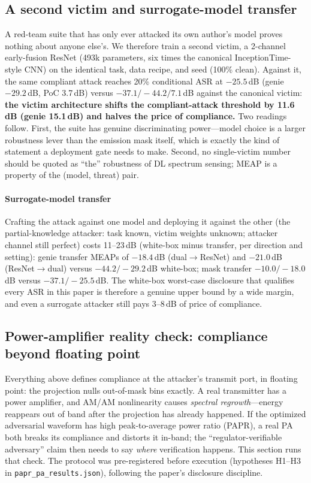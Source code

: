\documentclass[review]{elsarticle}
\begin{document}
\subsection{A second victim and surrogate-model transfer}
\label{sec:victim2}

A red-team suite that has only ever attacked its own author's model proves
nothing about anyone else's. We therefore train a second victim, a
2-channel early-fusion ResNet (493k parameters, six times the canonical
InceptionTime-style CNN) on the identical task, data recipe, and seed
(100\% clean). Against it, the same compliant attack reaches 20\%
conditional ASR at $-25.5$\,dB (genie $-29.2$\,dB, PoC 3.7\,dB) versus
$-37.1/-44.2/7.1$\,dB against the canonical victim: \textbf{the victim
architecture shifts the compliant-attack threshold by 11.6\,dB (genie
15.1\,dB) and halves the price of compliance.} Two readings follow. First, the suite has
genuine discriminating power---model choice is a larger robustness lever
than the emission mask itself, which is exactly the kind of statement a
deployment gate needs to make. Second, no single-victim number should be
quoted as ``the'' robustness of DL spectrum sensing; MEAP is a property of
the (model, threat) pair.

\paragraph{Surrogate-model transfer} Crafting the attack against one model
and deploying it against the other (the partial-knowledge attacker: task
known, victim weights unknown; attacker channel still perfect) costs
11--23\,dB (white-box minus transfer, per direction and setting): genie transfer MEAPs of $-18.4$\,dB (dual$\to$ResNet) and
$-21.0$\,dB (ResNet$\to$dual) versus $-44.2/-29.2$\,dB white-box; mask
transfer $-10.0/-18.0$\,dB versus $-37.1/-25.5$\,dB. The white-box
worst-case disclosure that qualifies every ASR in this paper is therefore
a genuine upper bound by a wide margin, and even a surrogate attacker
still pays 3--8\,dB of price of compliance.

\subsection{Power-amplifier reality check: compliance beyond floating point}
\label{sec:papr}

Everything above defines compliance at the attacker's transmit port, in
floating point: the projection nulls out-of-mask bins exactly. A real
transmitter has a power amplifier, and AM/AM nonlinearity causes
\emph{spectral regrowth}---energy reappears out of band after the
projection has already happened. If the optimized adversarial waveform
has high peak-to-average power ratio (PAPR), a real PA both breaks its
compliance and distorts it in-band; the ``regulator-verifiable adversary''
claim then needs to say \emph{where} verification happens. This section
runs that check. The protocol was pre-registered before execution
(hypotheses H1--H3 in \texttt{papr\_pa\_results.json}), following the
paper's disclosure discipline.
\end{document}
